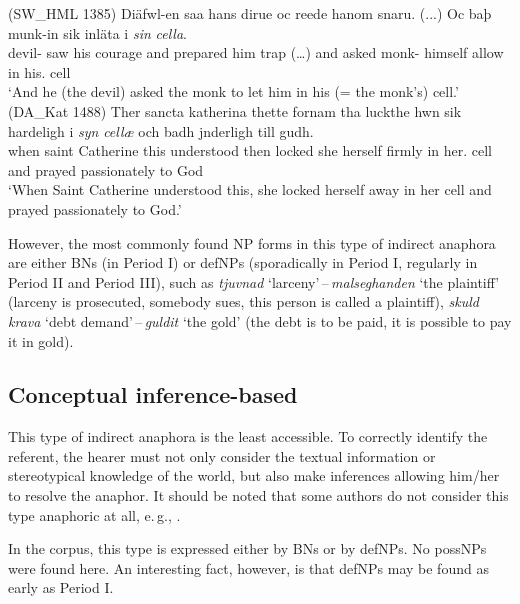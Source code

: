 \documentclass[output=paper]{langsci/langscibook}
\begin{document}
\begin{samepage}
\begin{exe}
\ex\label{6ex:31}
(SW\_HML 1385)
\exi{}
\gll Diäfwl-en saa hans dirue oc reede hanom snaru. (...) Oc baþ munk-in sik inläta i {\emph{sin}} {\emph{cella}}. \\
devil-{} saw his courage and prepared him trap (…) and asked monk-{} himself allow in his.{} cell \\
\glt `And he (the devil) asked the monk to let him in his (= the monk's) cell.'
\ex\label{6ex:32}
(DA\_Kat 1488)
\exi{}
\gll Ther sancta katherina thette fornam tha luckthe hwn sik hardeligh i {\emph{syn}} {\emph{cellæ}} och badh jnderligh till gudh. \\
when saint Catherine this understood then locked she herself firmly in her.{} cell and prayed passionately to God \\
\glt `When Saint Catherine understood this, she locked herself away in her cell and prayed passionately to God.'
\end{exe}
\end{samepage}

However, the most commonly found NP forms in this type of indirect anaphora are either BNs (in Period I) or defNPs (sporadically in Period I, regularly in Period II and Period III), such as {\emph{tjuvnad}} `larceny'\,--\,{\emph{malseghanden}} `the plaintiff' (larceny is prosecuted, somebody sues, this person is called a plaintiff), {\emph{skuld krava}} `debt demand'\,--\,{\emph{guldit}} `the gold' (the debt is to be paid, it is possible to pay it in gold).

\subsection{Conceptual inference-based}\label{6sec:44}

This type of indirect anaphora is the least accessible. To correctly identify the referent, the hearer must not only consider the textual information or stereotypical knowledge of the world, but also make inferences allowing him/her to resolve the anaphor. It should be noted that some authors do not consider this type anaphoric at all, e.\,g., \cite{irmer:11}. 

In the corpus, this type is expressed either by BNs or by defNPs. No possNPs were found here. An interesting fact, however, is that defNPs may be found as early as Period I. 
\end{document}
